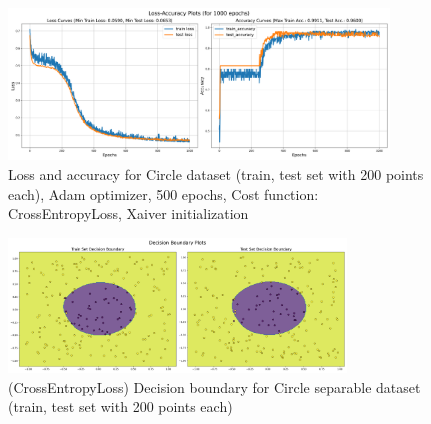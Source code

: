 \begin{solve}
\begin{figure}[H]
    \centering
    \includegraphics[width=0.9\textwidth]{plots/4_circle_adam_classificationloss_acc.png}
    \caption{Loss and accuracy for Circle dataset (train, test set with 200 points each), Adam optimizer, 500 epochs, Cost function: CrossEntropyLoss, Xaiver initialization}
\end{figure}

\begin{figure}[H]
    \centering
    \includegraphics[width=0.8\textwidth]{plots/4_circle_adam_classificationboundary.png}
    \caption{(CrossEntropyLoss) Decision boundary for Circle separable dataset (train, test set with 200 points each)}
\end{figure}

\end{solve}
